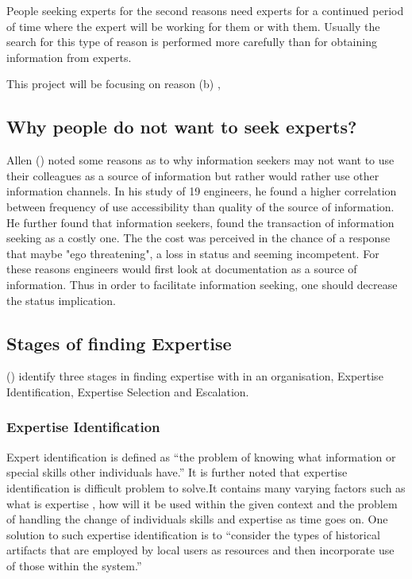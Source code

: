 \documentclass[a4paper,oneside,11pt]{report}
\begin{document}
People seeking experts for the second reasons need experts for a continued period of time where the expert will be working for them or with them. Usually the search for this type of reason is performed more carefully than for obtaining information from experts.

This project will be focusing on reason (b) , 

\subsection{Why people do not want to seek experts?}
Allen (\citeyear{allen1977}) noted some reasons as to why information seekers may not want to use their colleagues as a source of information but rather would rather use other information channels. In his study of 19 engineers, he found a higher correlation between frequency of use accessibility than quality of the source of information. He further found that information seekers, found the transaction of information seeking as a costly one. The the cost was perceived in the chance of a response that maybe "ego threatening", a loss in status and seeming incompetent. For these reasons engineers would first look at documentation as a source of information. Thus in order to facilitate information seeking, one should decrease the status implication.

\subsection{Stages of finding Expertise}
\citeauthor{mcdonalackerman1998}(\citeyear{mcdonalackerman1998}) identify three stages in finding expertise with in an organisation, Expertise Identification, Expertise Selection and Escalation.  
\subsubsection{Expertise Identification} 
Expert identification is defined as \enquote {the problem of knowing what information or special skills other individuals have.} It is further noted that expertise identification is difficult problem to solve.It contains many varying factors such as what is expertise , how will it be used within the given context and the problem of handling the change of individuals skills and expertise as time goes on. One solution to such expertise identification is to \enquote {consider the types of historical artifacts that are employed by local users as resources and then incorporate use of those within the system.}\autocite{mcdonalackerman1998}
\end{document}
